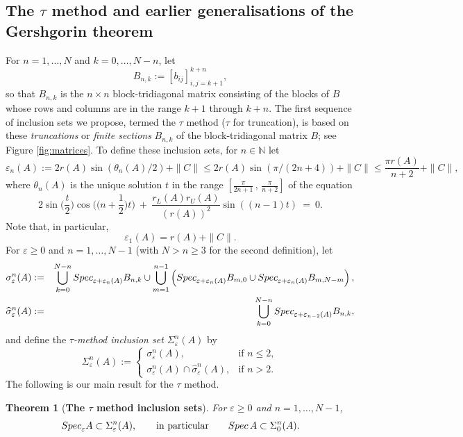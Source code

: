 \documentclass[preprint,1p,11pt]{elsarticle}
\newcommand\N{{\mathbb N}}
\newcommand\eps{{\varepsilon}}
\newcommand\Spec{{\rm Spec}\,}  %
\newcommand\Specn{{\rm Spec}}   %
\newcommand\Speps{{\rm Spec}_\eps}
\newtheorem{theorem}{Theorem}[section]
\numberwithin{equation}{section}   %
\numberwithin{figure}{section}  %
\begin{document}
\subsection{The $\tau$ method and earlier generalisations of the Gershgorin theorem} \label{sec:tau}
For $n=1,\ldots,N$ and $k=0,\ldots,N-n$, let 
$$
B_{n,k}:=[b_{ij}]_{i,j=k+1}^{k+n},
$$ 
so that $B_{n,k}$ is the $n\times n$ block-tridiagonal matrix consisting of the blocks of $B$ whose rows and columns are in the range $k+1$ through $k+n$. The first sequence  of inclusion sets we propose, termed the $\tau$ method ($\tau$ for truncation), is based on these {\it truncations} or {\it finite sections} $B_{n,k}$ of the block-tridiagonal matrix $B$; see Figure \ref{fig:matrices}. To define these inclusion sets,  for $n\in \N$ let
\begin{equation} \label{eq:epsdef}
\eps_n(A) := 2r(A) \sin(\theta_n(A)/2) + \|C\| \leq 2r(A) \sin(\pi/(2n+4)) + \|C\|\leq \frac{\pi r(A)}{n+2} + \|C\|,
\end{equation}
where $\theta_n(A)$ is the unique solution $t$ in the range
$\left[\frac{\pi}{2n+1}\,,\,\frac{\pi}{n+2}\right]$
of the equation
\begin{equation} \label{eq:theta}
2\sin\Big(\frac{t}{2}\Big)\cos\Big(\Big(n+\frac{1}{2}\Big)t\Big)\ +\ \frac{r_L(A)r_U(A)}{(r(A))^2} \sin\left(\left(n-1\right) t\right)\ =\ 0.
\end{equation}
Note that, in particular, 
$$
\eps_1(A)= r(A)+\|C\|.
$$
For $\eps\geq 0$ and $n=1,\ldots,N-1$ (with $N> n\geq 3$ for the second definition), let
\begin{eqnarray*}
\sigma^n_{\eps}(A) &:=& \bigcup_{k=0}^{N-n} \Specn_{\eps+\eps_n(A)} B_{n,k} \cup \bigcup_{m=1}^{n-1} \left(\Specn_{\eps+\eps_n(A)} B_{m,0}\cup \Specn_{\eps+\eps_n(A)} B_{m,N-m}\right),\\
\widehat \sigma^n_{\eps}(A) &:=&\bigcup_{k=0}^{N-n} \Specn_{\eps+\eps_{n-2}(A)} B_{n,k},
\end{eqnarray*}
and define the {\it $\tau$-method inclusion set $\Sigma^n_{\eps}(A)$} by
\begin{equation} \label{eq:Sigdef}
\Sigma^n_{\eps}(A) := \left\{\begin{array}{ll}\sigma^n_{\eps}(A), & \mbox{if } n\leq 2,\\
\sigma^n_{\eps}(A) \cap \widehat \sigma^n_{\eps}(A),& \mbox{if } n> 2.\end{array} \right.
\end{equation}
The following is our main result for the $\tau$ method.
\begin{theorem}[\bf The $\tau$ method inclusion sets] \label{thm:tau} For $\eps\geq 0$ and $n=1,\ldots,N-1$,
$$
\Speps A \subset \Sigma^n_{\eps}(A), \qquad \mbox{in particular} \qquad \Spec A \subset  \Sigma^n_{0}(A).
$$
\end{theorem}
\end{document}
